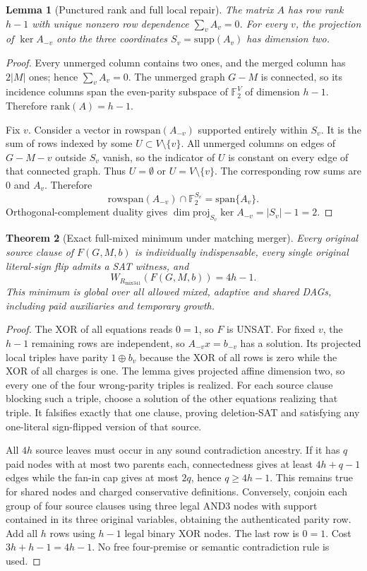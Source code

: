 \documentclass[11pt]{article}
\newtheorem{theorem}{Theorem}
\newtheorem{lemma}[theorem]{Lemma}
\begin{document}
\begin{lemma}[Punctured rank and full local repair]
The matrix \(A\) has row rank \(h-1\) with unique nonzero row dependence \(\sum_vA_v=0\). For every \(v\), the projection of \(\ker A_{-v}\) onto the three coordinates \(S_v=\mathrm{supp}(A_v)\) has dimension two.
\end{lemma}
\begin{proof}
Every unmerged column contains two ones, and the merged column has \(2|M|\) ones; hence \(\sum_vA_v=0\). The unmerged graph \(G-M\) is connected, so its incidence columns span the even-parity subspace of \(\mathbb F_2^V\) of dimension \(h-1\). Therefore \(\mathrm{rank}(A)=h-1\).

Fix \(v\). Consider a vector in \(\mathrm{rowspan}(A_{-v})\) supported entirely within \(S_v\). It is the sum of rows indexed by some \(U\subset V\setminus\{v\}\). All unmerged columns on edges of \(G-M-v\) outside \(S_v\) vanish, so the indicator of \(U\) is constant on every edge of that connected graph. Thus \(U=\emptyset\) or \(U=V\setminus\{v\}\). The corresponding row sums are \(0\) and \(A_v\). Therefore
\[
 \mathrm{rowspan}(A_{-v})\cap\mathbb F_2^{S_v}=\mathrm{span}\{A_v\}.
\]
Orthogonal-complement duality gives
\(\dim\mathrm{proj}_{S_v}\ker A_{-v}=|S_v|-1=2\).
\end{proof}

\begin{theorem}[Exact full-mixed minimum under matching merger]
Every original source clause of \(F(G,M,b)\) is individually indispensable, every single original literal-sign flip admits a SAT witness, and
\[
 \boxed{W_{R_{\mathrm{mix341}}}(F(G,M,b))=4h-1}.
\]
This minimum is global over \emph{all} allowed mixed, adaptive and shared DAGs, including paid auxiliaries and temporary growth.
\end{theorem}
\begin{proof}
The XOR of all equations reads \(0=1\), so \(F\) is UNSAT. For fixed \(v\), the \(h-1\) remaining rows are independent, so \(A_{-v}x=b_{-v}\) has a solution. Its projected local triples have parity \(1\oplus b_v\) because the XOR of all rows is zero while the XOR of all charges is one. The lemma gives projected affine dimension two, so every one of the four wrong-parity triples is realized. For each source clause blocking such a triple, choose a solution of the other equations realizing that triple. It falsifies exactly that one clause, proving deletion-SAT and satisfying any one-literal sign-flipped version of that source.

All \(4h\) source leaves must occur in any sound contradiction ancestry. If it has \(q\) paid nodes with at most two parents each, connectedness gives at least \(4h+q-1\) edges while the fan-in cap gives at most \(2q\), hence \(q\ge4h-1\). This remains true for shared nodes and charged conservative definitions. Conversely, conjoin each group of four source clauses using three legal AND3 nodes with support contained in its three original variables, obtaining the authenticated parity row. Add all \(h\) rows using \(h-1\) legal binary XOR nodes. The last row is \(0=1\). Cost \(3h+h-1=4h-1\). No free four-premise or semantic contradiction rule is used.
\end{proof}
\end{document}
